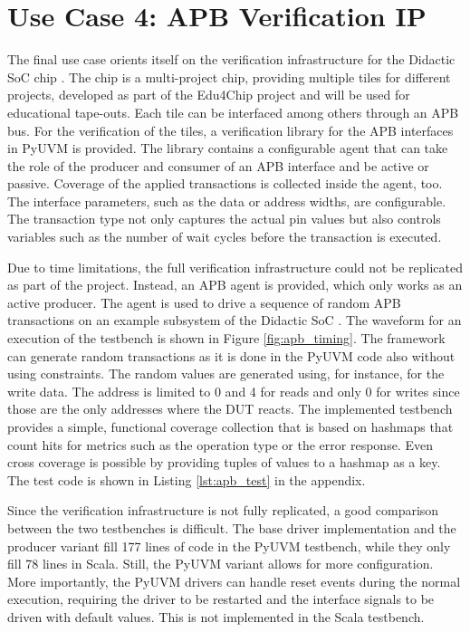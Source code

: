 


\section{Use Case 4: APB Verification IP} %

The final use case orients itself on the verification infrastructure for the Didactic SoC chip \cite{didactic}. The chip is a multi-project chip, providing multiple tiles for different projects, developed as part of the Edu4Chip project \cite{edu4chip} and will be used for educational tape-outs. Each tile can be interfaced among others through an APB bus. For the verification of the tiles, a verification library for the APB interfaces in PyUVM is provided. The library contains a configurable agent that can take the role of the producer and consumer of an APB interface and be active or passive. Coverage of the applied transactions is collected inside the agent, too. The interface parameters, such as the data or address widths, are configurable. The transaction type not only captures the actual pin values but also controls variables such as the number of wait cycles before the transaction is executed. 

Due to time limitations, the full verification infrastructure could not be replicated as part of the project. Instead, an APB agent is provided, which only works as an active producer. The agent is used to drive a sequence of random APB transactions on an example subsystem of the Didactic SoC . The waveform for an execution of the testbench is shown in Figure \ref{fig:apb_timing}. The framework can generate random transactions as it is done in the PyUVM code also without using constraints. The random values are generated using, for instance,  for the write data. The address is limited to 0 and 4 for reads and only 0 for writes since those are the only addresses where the DUT reacts. The implemented testbench provides a simple, functional coverage collection that is based on hashmaps that count hits for metrics such as the operation type or the error response. Even cross coverage is possible by providing tuples of values to a hashmap as a key. The test code is shown in Listing \ref{lst:apb_test} in the appendix.

Since the verification infrastructure is not fully replicated, a good comparison between the two testbenches is difficult. The base driver implementation and the producer variant fill 177 lines of code in the PyUVM testbench, while they only fill 78 lines in Scala. Still, the PyUVM variant allows for more configuration. More importantly, the PyUVM drivers can handle reset events during the normal execution, requiring the driver to be restarted and the interface signals to be driven with default values. This is not implemented in the Scala testbench. 

